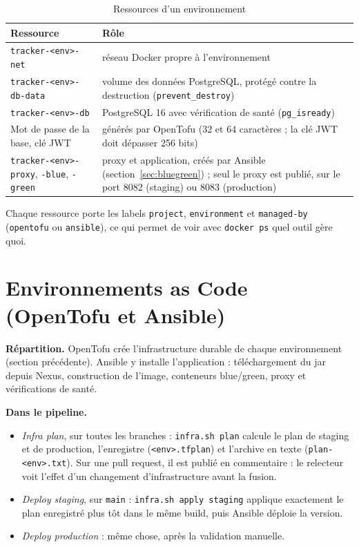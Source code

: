 \documentclass[11pt,a4paper]{report}
\begin{document}
\begin{table}[H]
  \centering
  \small
  \begin{tabularx}{\textwidth}{@{}L{4.2cm}Y@{}}
    \toprule
    \textbf{Ressource} & \textbf{Rôle} \\
    \midrule
    \texttt{tracker-<env>-net} & réseau Docker propre à l'environnement \\
    \texttt{tracker-<env>-db-data} & volume des données PostgreSQL, protégé contre la destruction (\texttt{prevent\_destroy}) \\
    \texttt{tracker-<env>-db} & PostgreSQL 16 avec vérification de santé (\texttt{pg\_isready}) \\
    Mot de passe de la base, clé JWT & générés par OpenTofu (32 et 64 caractères ; la clé JWT doit dépasser 256 bits) \\
    \texttt{tracker-<env>-proxy}, \texttt{-blue}, \texttt{-green} & proxy et application, créés par Ansible (section~\ref{sec:bluegreen}) ; seul le proxy est publié, sur le port 8082 (staging) ou 8083 (production) \\
    \bottomrule
  \end{tabularx}
  \caption{Ressources d'un environnement}
\end{table}

Chaque ressource porte les labels \texttt{project}, \texttt{environment} et \texttt{managed-by} (\texttt{opentofu} ou \texttt{ansible}), ce qui permet de voir avec \texttt{docker ps} quel outil gère quoi.

\section{Environnements as Code (OpenTofu et Ansible)}
\textbf{Répartition.} OpenTofu crée l'infrastructure durable de chaque environnement (section précédente). Ansible y installe l'application : téléchargement du jar depuis Nexus, construction de l'image, conteneurs blue/green, proxy et vérifications de santé.

\textbf{Dans le pipeline.}
\begin{itemize}
  \item \emph{Infra plan}, sur toutes les branches : \texttt{infra.sh plan} calcule le plan de staging et de production, l'enregistre (\texttt{<env>.tfplan}) et l'archive en texte (\texttt{plan-<env>.txt}). Sur une pull request, il est publié en commentaire : le relecteur voit l'effet d'un changement d'infrastructure avant la fusion.
  \item \emph{Deploy staging}, sur \texttt{main} : \texttt{infra.sh apply staging} applique exactement le plan enregistré plus tôt dans le même build, puis Ansible déploie la version.
  \item \emph{Deploy production} : même chose, après la validation manuelle.
\end{itemize}
\end{document}
